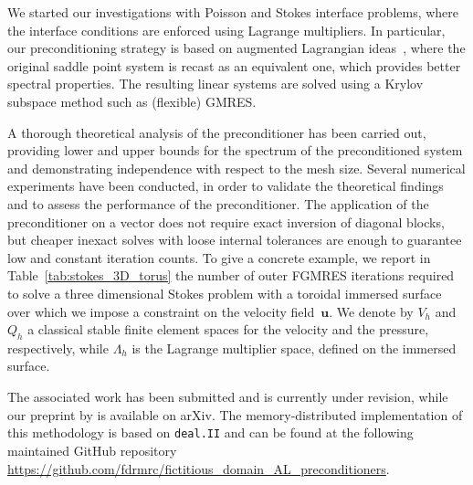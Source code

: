 \documentclass[a4paper,12pt]{article}
\begin{document}
We started our investigations with Poisson and Stokes interface problems, where the interface conditions are enforced
using Lagrange multipliers. In particular, our preconditioning strategy is based on augmented Lagrangian ideas~\citep{BenziAL}, where the original saddle point system is recast
as an equivalent one, which provides better spectral properties. The resulting linear systems are solved using a Krylov subspace method such as (flexible) GMRES.

A thorough theoretical analysis of the preconditioner has been carried out, providing lower and upper bounds for the spectrum of
the preconditioned system and demonstrating independence with respect to the mesh size. Several numerical experiments have been conducted,
in order to validate the theoretical findings and to assess the performance of the preconditioner. The application of the
preconditioner on a vector does not require exact inversion of diagonal blocks, but cheaper inexact solves with loose internal tolerances are enough to guarantee
low and constant iteration counts. To give a concrete example, we report in Table~\ref{tab:stokes_3D_torus} the number of
outer FGMRES iterations required to solve a three dimensional Stokes problem with a toroidal immersed surface over which we impose a constraint on the
velocity field~$\mathbf{u}$. We denote by $V_h$ and $Q_h$ a classical stable finite element spaces for the velocity and the pressure, respectively, while
$\Lambda_h$ is the Lagrange multiplier space, defined on the immersed surface.

The associated work has been submitted and is currently under revision, while our preprint by \cite{ALprec} is available on
arXiv. The memory-distributed implementation of this methodology is based on \texttt{deal.II}
and can be found at the following maintained GitHub
repository \url{https://github.com/fdrmrc/fictitious_domain_AL_preconditioners}.



\begin{center}
      \begin{minipage}{\linewidth}
            \centering
            \label{tab:stokes_3D_torus}
      \end{minipage}
\end{center}
\end{document}
